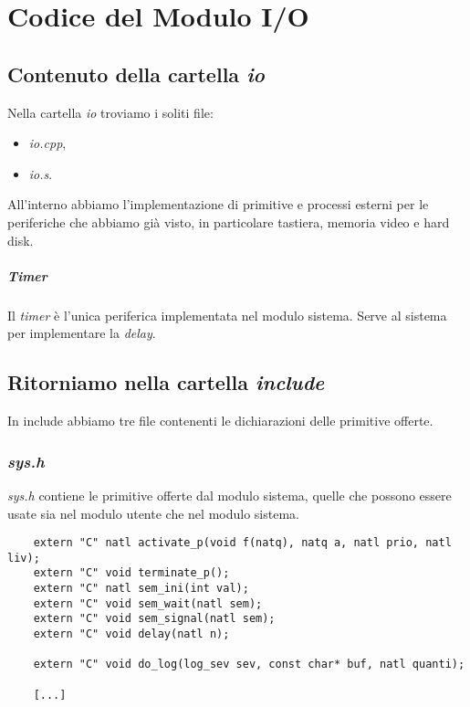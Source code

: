 
\chapter{Codice del Modulo I/O}
\section{Contenuto della cartella \emph{io}}
Nella cartella \emph{io} troviamo i soliti file:
\begin{itemize}
	\item \emph{io.cpp},
	\item \emph{io.s}.
\end{itemize}
All'interno abbiamo l'implementazione di primitive e processi esterni per le periferiche che abbiamo già visto, in particolare tastiera, memoria video e hard disk. 
\paragraph{Timer} Il \emph{timer} è l'unica periferica implementata nel modulo sistema. Serve al sistema per implementare la \emph{delay}.
\section{Ritorniamo nella cartella \emph{include}}
In include abbiamo tre file contenenti le dichiarazioni delle primitive offerte. \subsection{\emph{sys.h}}
\emph{sys.h} contiene le primitive offerte dal modulo sistema, quelle che possono essere usate sia nel modulo utente che nel modulo sistema.
\small
\begin{verbatim}
	extern "C" natl activate_p(void f(natq), natq a, natl prio, natl liv);
	extern "C" void terminate_p();
	extern "C" natl sem_ini(int val);
	extern "C" void sem_wait(natl sem);
	extern "C" void sem_signal(natl sem);
	extern "C" void delay(natl n);
	
	extern "C" void do_log(log_sev sev, const char* buf, natl quanti);
	
	[...]
\end{verbatim}
\normalsize
